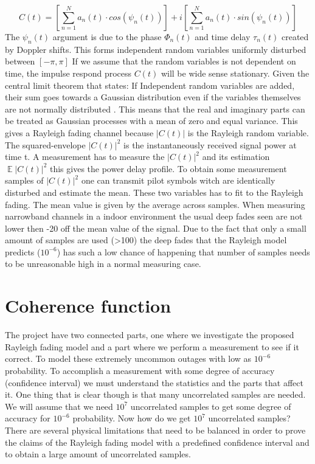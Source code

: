 \begin{equation}
C(t) = \left [ \sum_{n =1}^{N} a_n(t)\cdot cos(\psi_n (t))\right ] + i\left [\sum_{n =1}^{N} a_n(t)\cdot sin(\psi_n (t))  \right ]
\end{equation}
The $\psi_n(t)$ argument is due to the phase $\Phi_n(t)$ and time delay $\tau_n(t)$ created by Doppler shifts. This forms independent random variables  uniformly disturbed between $[-\pi,\pi]$
If we assume that the random variables is not dependent on time, the impulse respond process $C(t)$ will be wide sense stationary. Given the central limit theorem that states:
If Independent random variables are added, their sum goes towards a Gaussian distribution even if the variables themselves are not normally distributed \citep{CentralLimit}.  
This means that the real and imaginary parts can be treated as Gaussian processes with a mean of zero and equal variance. This gives a Rayleigh fading channel because $ \left | C(t) \right | $ is the Rayleigh random variable. The squared-envelope $ \left | C(t) \right |^2 $ is the instantaneously received signal power at time t.
A measurement has to measure the $ \left | C(t) \right |^2 $ and its estimation $ \mathop{\mathbb{E}}\left | C(t) \right |^2 $ this gives the power delay profile. To obtain some measurement samples of $ \left | C(t) \right |^2 $ one can transmit pilot symbols witch are identically disturbed and estimate the mean.\citep{MeasurementComplexRay}
These two variables has to fit to the Rayleigh fading. The mean value is given by the average across samples.
When measuring narrowband channels in a indoor environment the usual deep fades seen are not lower then -20 off the mean value of the signal. Due to the fact that only a small amount of samples are used (>100) the deep fades that the Rayleigh model predicts ($10^{-6}$) has such a low chance of happening that number of samples needs to be unreasonable high in a normal measuring case.




\section{Coherence function}
The project have two connected parts, one where we investigate the proposed Rayleigh fading model and a part where we perform a measurement to see if it correct.  To model these extremely uncommon outages with low as $10^{-6}$ probability. To accomplish a measurement with some degree of accuracy (confidence interval) we must understand the statistics and the parts that affect it. One thing that is clear though is that many uncorrelated samples are needed. We will assume that we need $10^7$ uncorrelated samples to get some degree of accuracy for $10^{-6}$ probability. Now how do we get $10^7$ uncorrelated samples?
There are several physical limitations that need to be balanced  in order to prove the claims of the Rayleigh fading model with a predefined confidence interval and to obtain a large amount of uncorrelated samples.

